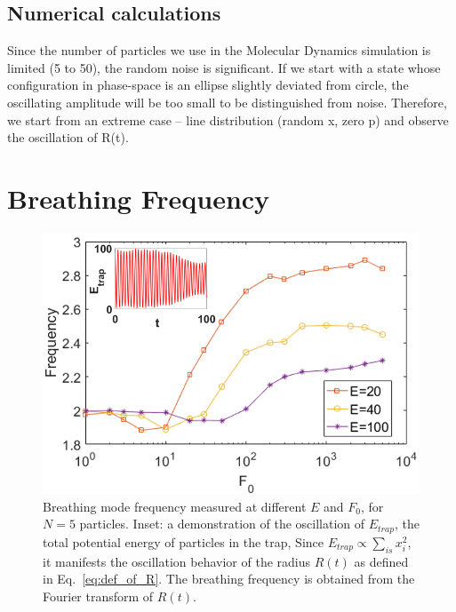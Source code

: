 \documentclass[aps,preprintnumbers,onecolumn,amsmath,amssymb,floatfix,pra]{revtex4-1}
\begin{document}
\subsection{Numerical calculations}



Since the number of particles we use in the Molecular Dynamics simulation is limited (5 to 50), the
random noise is significant. If we start with a state whose configuration in phase-space is an
ellipse slightly deviated from circle, the oscillating amplitude will be too small to be
distinguished from noise. Therefore, we start from an extreme case -- line distribution (random x,
zero p) and observe the oscillation of R(t).





\section{Breathing Frequency}\label{section:breathing frequency}


\begin{figure}[h]
\center
\includegraphics[scale=0.32]{ZhiyuPictures/freq_scanF_differentE_log_2_with_oscillation_demo.png}
\caption{Breathing mode frequency measured at different $E$ and $F_0$, for $N=5$ particles. Inset: a
  demonstration of the oscillation of $E_{trap}$, the total potential energy of particles in the
  trap, Since $E_{trap}\propto \sum_{is}{x_i^2}$, it manifests the oscillation behavior of the
  radius $R(t)$ as defined in Eq.~\ref{eq:def_of_R}.  The breathing frequency is obtained from the
  Fourier transform of $R(t)$.}
\label{fig:Breathingfrequency1}
\end{figure}
\end{document}

